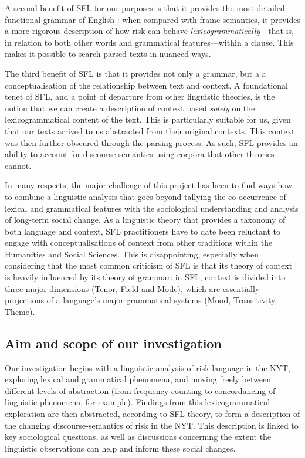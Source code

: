 \documentclass{report}
\begin{document}
A second benefit of SFL for our purposes is that it provides the most detailed functional grammar of English \cite{eggins_analysing:_2004}: when compared with frame semantics, it provides a more rigorous description of how risk can behave \emph{lexicogrammatically}---that is, in relation to both other words and grammatical features---within a clause. This makes it possible to search parsed texts in nuanced ways.

The third benefit of SFL is that it provides not only a grammar, but a a conceptualisation of the relationship between text and context. A foundational tenet of SFL, and a point of departure from other linguistic theories, is the notion that we can create a description of context based \emph{solely} on the lexicogrammatical content of the text. This is particularly suitable for us, given that our texts arrived to us abstracted from their original contexts. This context was then further obscured through the parsing process. As such, SFL provides an ability to account for discourse-semantics using corpora that other theories cannot.

In many respects, the major challenge of this project has been to find ways how to combine a linguistic analysis that goes beyond tallying the co-occurrence of lexical and grammatical features with the sociological understanding and analysis of long-term social change. As a linguistic theory that provides a taxonomy of both language and context, SFL practitioners have to date been reluctant to engage with conceptualisations of context from other traditions within the Humanities and Social Sciences. This is disappointing, especially when considering that the most common criticism of SFL is that its theory of context is heavily influenced by its theory of grammar: in SFL, context is divided into three major dimensions (Tenor, Field and Mode), which are essentially projections of a language's major grammatical systems (Mood, Transitivity, Theme).


\subsection{Aim and scope of our investigation}

Our investigation begins with a linguistic analysis of risk language in the NYT, exploring lexical and grammatical phenomena, and moving freely between different levels of abstraction (from frequency counting to concordancing of linguistic phenomena, for example). Findings from this lexicogrammatical exploration are then abstracted, according to SFL theory, to form a description of the changing discourse-semantics of risk in the NYT. This description is linked to key sociological questions, as well as discussions concerning the extent the linguistic observations can help and inform these social changes. 
\end{document}

